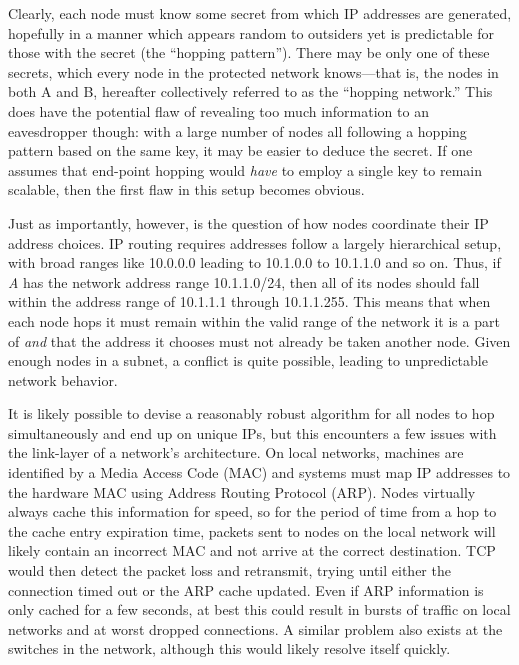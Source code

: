 \par Clearly, each node must know some secret from which IP addresses are generated, hopefully in a manner which appears random to outsiders yet is predictable for those with the secret (the ``hopping pattern''). There may be only one of these secrets, which every node in the protected network knows---that is, the nodes in both A and B, hereafter collectively referred to as the ``hopping network.'' This does have the potential flaw of revealing too much information to an eavesdropper though: with a large number of nodes all following a hopping pattern based on the same key, it may be easier to deduce the secret. If one assumes that end-point hopping would \textit{have} to employ a single key to remain scalable, then the first flaw in this setup becomes obvious.

\par Just as importantly, however, is the question of how nodes coordinate their IP address choices. IP routing requires addresses follow a largely hierarchical setup, with broad ranges like 10.0.0.0 leading to 10.1.0.0 to 10.1.1.0 and so on. Thus, if \textit{A} has the network address range 10.1.1.0/24, then all of its nodes should fall within the address range of 10.1.1.1 through 10.1.1.255. This means that when each node hops it must remain within the valid range of the network it is a part of \textit{and} that the address it chooses must not already be taken another node. Given enough nodes in a subnet, a conflict is quite possible, leading to unpredictable network behavior. 

\par It is likely possible to devise a reasonably robust algorithm for all nodes to hop simultaneously and end up on unique IPs, but this encounters a few issues with the link-layer of a network's architecture. On local networks, machines are identified by a Media Access Code (MAC) and systems must map IP addresses to the hardware MAC using Address Routing Protocol (ARP). Nodes virtually always cache this information for speed, so for the period of time from a hop to the cache entry expiration time, packets sent to nodes on the local network will likely contain an incorrect MAC and not arrive at the correct destination. TCP would then detect the packet loss and retransmit, trying until either the connection timed out or the ARP cache updated. Even if ARP information is only cached for a few seconds, at best this could result in bursts of traffic on local networks and at worst dropped connections. A similar problem also exists at the switches in the network, although this would likely resolve itself quickly.

